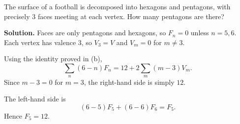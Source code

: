 \begin{solution}
	\par\smallskip\noindent\textbullet\enspace 
	The surface of a football is decomposed into hexagons and pentagons,
	with precisely $3$ faces meeting at each vertex.
	How many pentagons are there?
	
	\medskip
	\textbf{Solution.}
	Faces are only pentagons and hexagons, so $F_n=0$ unless $n=5,6$.
	Each vertex has valence $3$, so $V_3 = V$ and $V_m = 0$ for $m \ne 3$.
	
	Using the identity proved in (b),
	\[
	\sum_n (6-n)F_n = 12 + 2\sum_m (m-3)V_m.
	\]
	Since $m-3=0$ for $m=3$, the right-hand side is simply $12$.
	
	The left-hand side is
	\[
	(6-5)F_5 + (6-6)F_6 = F_5.
	\]
	Hence $F_5 = 12$.

\end{solution}

